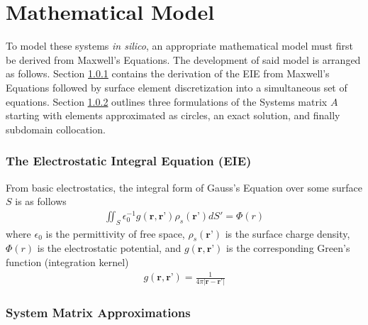 \section{Mathematical Model}
\label{sec:mathmod}

To model these systems \textit{in silico}, an appropriate mathematical model must first be derived from Maxwell's Equations. The development of said model is arranged as follows. Section \ref{subsub:eie} contains the derivation of the EIE from Maxwell's Equations followed by surface element discretization into a simultaneous set of equations. Section \ref{subsub:mat-approx} outlines three formulations of the Systems matrix $A$ starting with elements approximated as circles, an exact solution, and finally subdomain collocation. 

\subsubsection{The Electrostatic Integral Equation (EIE)}
\label{subsub:eie}
From basic electrostatics, the integral form of Gauss's Equation over some surface $S$ is as follows
\begin{align}
    \iint_S\epsilon_0^{-1}g(\textbf{r},\textbf{r'})\rho_s(\textbf{r'})dS'=\Phi(r)
\end{align}
where $\epsilon_0$ is the permittivity of free space, $\rho_s(\textbf{r'})$ is the surface charge density, $\Phi(r)$ is the electrostatic potential, and $g(\textbf{r},\textbf{r'})$ is the corresponding Green's function (integration kernel)
\begin{align}
    g(\textbf{r},\textbf{r'})=\frac{1}{4\pi|\textbf{r}-\textbf{r'}|}
\end{align}

\subsubsection{System Matrix Approximations}
\label{subsub:mat-approx}




